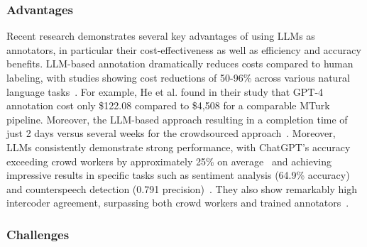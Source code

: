 \subsubsection{Advantages}

Recent research demonstrates several key advantages of using LLMs as annotators, in particular their cost-effectiveness as well as efficiency and accuracy benefits.
LLM-based annotation dramatically reduces costs compared to human labeling, with studies showing cost reductions of 50-96\% across various natural language tasks~\cite{DBLP:conf/emnlp/WangLXZZ21}.
For example, He et al. found in their study that GPT-4 annotation cost only \$122.08 compared to \$4,508 for a comparable MTurk pipeline.
Moreover, the LLM-based approach resulting in a completion time of just 2 days versus several weeks for the crowdsourced approach~\cite{DBLP:conf/chi/HeHDRH24}.
Moreover, LLMs consistently demonstrate strong performance, with ChatGPT's accuracy exceeding crowd workers by approximately 25\% on average~\cite{DBLP:journals/corr/abs-2303-15056} and achieving impressive results in specific tasks such as sentiment analysis (64.9\% accuracy) and counterspeech detection (0.791 precision)~\cite{DBLP:journals/corr/abs-2304-10145}. They also show remarkably high intercoder agreement, surpassing both crowd workers and trained annotators~\cite{DBLP:journals/corr/abs-2303-15056}.

\subsubsection{Challenges}

